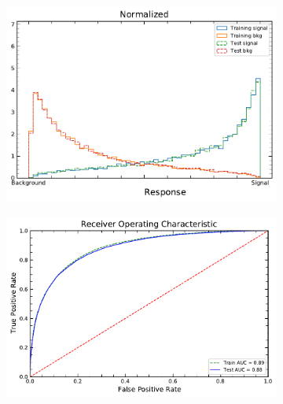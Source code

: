 
\begin{figure}[!h] 
  \begin{subfigure}[b]{0.5\linewidth}
    \centering
    \vspace*{-0.2cm}
    \includegraphics[width=0.95\linewidth]{ubonn-thesis/Chapters/Chapters_06/Figure/CR_4j2b/NormalizedResponse_PLV_4j2b_L27_20_10_06Oct2021.pdf} 
    \caption{} 
    \label{CR:4j2b:NNout} 
  \end{subfigure}%
  \vspace*{0.4cm}
  \begin{subfigure}[b]{0.5\linewidth}
    \centering
    \vspace*{-0.2cm}
    \includegraphics[width=\linewidth]{ubonn-thesis/Chapters/Chapters_06/Figure/CR_4j2b/ROC_PLV_4j2b_L27_20_10_06Oct2021.pdf} 

\end{subfigure}
\end{figure}
